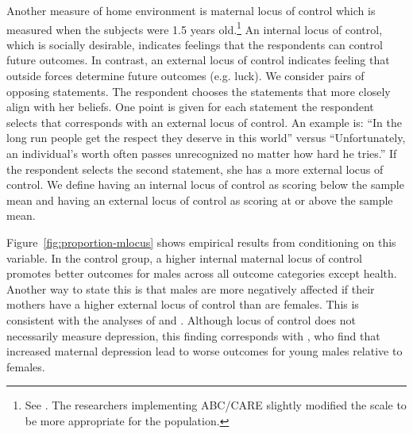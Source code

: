Another measure of home environment is maternal locus of control which is measured when the subjects were 1.5 years old.\footnote{See \citet{Rotter_1966_PMGaA}. The researchers implementing ABC/CARE slightly modified the scale to be more appropriate for the population.} An internal locus of control, which is socially desirable, indicates feelings that the respondents can control future outcomes. In contrast, an external locus of control indicates feeling that outside forces determine future outcomes (e.g. luck). We consider pairs of opposing statements. The respondent chooses the statements that more closely align with her beliefs. One point is given for each statement the respondent selects that corresponds with an external locus of control. An example is: ``In the long run people get the respect they deserve in this world'' versus ``Unfortunately, an individual's worth often passes unrecognized no matter how hard he tries.'' If the respondent selects the second statement, she has a more external locus of control.  We define having an internal locus of control as scoring below the sample mean and having an external locus of control as scoring at or above the sample mean.

Figure~\ref{fig:proportion-mlocus} shows empirical results from conditioning on this variable. In the control group, a higher internal maternal locus of control promotes better outcomes for males across all outcome categories except health. Another way to state this is that males are more negatively affected if their mothers have a higher external locus of control than are females. This is consistent with the analyses of \citet{Schore_2017_IMHJ} and \citet{golding2016psychology}. Although locus of control does not necessarily measure depression, this finding corresponds with \citet{Beeghly-etal_2017_IMHJ}, who find that increased maternal depression lead to worse outcomes for young males relative to females.

